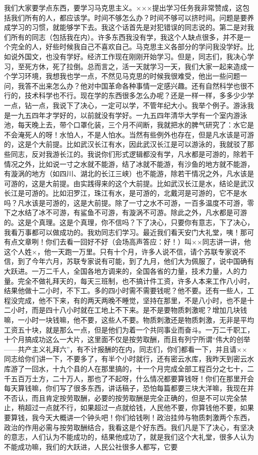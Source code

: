 我们大家要学点东西，要学习马克思主义。×××提出学习任务我非常赞成，这包括我们所有的人，都应该学。时间不够怎么办？时间不够可以挤时间。问题是要养成学习的习惯，就能够学下去。我这个话首先是对犯错误的同志说的。第二是对我们所有的同志（包括我在内）。许多东西我没有学，我这个人缺点很多，并不是一个完全的人，好些时候我自己不喜欢自己。马克思主义各部分的学问我没学好。比如说外国文，也没有学好。经济工作现在刚刚开始学习。但是，同志们，我决心学习，至死方休，死了拉倒。总而言之，活一天就学习一天，我们大家一起来造成一个学习环境，我想我也学一点，不然见马克思的时候我很难受，他出一些问题一问，我答不出来怎么办？他对中国革命各种事情一定感兴趣。还有自然科学也很不行的，技术科学也不行。现在学的东西很多怎么办呢？还是一样一样，多多少少学一点，钻一点，我说下了决心，一定可以学，不管年纪大小。我举个例子。游泳我是一九五四年才学好的，以前就没有学好。一九五四年清华大学有一个室内游泳池，每天晚上去，带个口罩化装，三个月不间断，我就把水的脾气研究了：水它是不会淹死人的呀！水怕人，不是人怕水。当然有些例外也存在，但是凡水该是可游的，这是个大前提。比如武汉长江有水，因此武汉长江是可以游泳的，我就驳了那些同志，反对我游长江的。我说你们形式逻辑都没有学，凡水都是可游的，除若干情况之外，比如说一寸之水就不能游，结了冰就不能游，有沙鱼的地方就不能游，有漩涡的地方（如四川、湖北的长江三峡）也不能游，除若干情况之外，凡水该是可游的，这是大前提。由实践得来的这个大前提。比如武汉长江是水，结论是武汉长江是可游的。比如汨罗江，珠江有水，是可游的，北戴河是可游的，它不是水吗？凡水该是可游的，这是大前提。除了一寸之水不可游，一百多温度不可游，零下之水结了冰不可游，有鲨鱼不可游，有漩涡不可游。除此之外，凡水都是可游的。这是个真理。这是个真理，你不信吗？下了决心，只要你有意志，下了决心，我看万事都可以做成功的。我劝同志们学习。最近我们看天安门大礼堂，咦！那可有点文章咧！你们去看一回好不好（会场高声答应：好！）叫××同志讲一讲，他这个人姓×，他一天跑一万里。只有十个月，许多人说不信，请个苏联专家说不信，到了今年六月，苏联专家说有可能，到了九月，他们大为佩服了，说中国确有大跃进。一万二千人，全国各地方调来的，全国各省的力量，技术力量，人的力量。完全不做礼拜天的，每天三班制，也不搞计件工资，许多人本来工作八小时，结果他做十二小时，不下工。多的四小时需不需要钱呢？他不要。还有一些人，工程没完成，他不下来，有的两天两晚不睡觉，坚持在那里，不是八小时，也不是十二小时，而是四十八小时就在工地上不下来。是不是要物质刺激呢？增加几块钱嘛，一小时一块钱嘛，他不要，这些人不要。物质刺激还是物质刺激，无非是平均工资五十块，就是那么一点，但是他们为着一个共同事业而奋斗。一万二千职工，十个月搞成功这么一大片，这里面不仅是按劳取酬，而且有列宁所谓“伟大的创举——共产主义礼拜六”，有不计报酬的在内，同志们，你们都看一下，并且请××同志给你们讲一下，不要多了，有半个小时就行，还有密云水库，我昨天到密云水库游了一回水，十九个县的人在那里搞的，十一个月完成全部工程百分之七十，二千五百万土方，二十万人，那也了不起呀，什么情况都要算钱呀！你们在那里开会每天算钱嘛，你们写了很多东西，讲话稿子，恐怕每篇都要三块大洋嘛，我现在并不否认，而且肯定按劳取酬，必要的按劳取酬是完全正确的，但是不可以完全禁止，稍超过一点就不行，如果超过一点就给钱，人民他不要，你算钱他不要，如果要算钱，我今天大概讲一个钟头吧！你们给钱咧！政治挂帅与物质刺激两个东西，政治的作用必需与按劳取酬结合，我看这是个好东西。我们凡是下了决心，有坚决的意志，人们认为不能成功的，结果他成功了，就是我们这个大礼堂，很多人认为不能成功嘛，我们的大跃进，人民公社很多人都写，它要